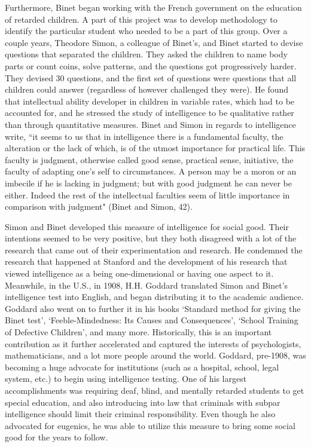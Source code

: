 \documentclass[12pt, oneside]{article}
\begin{document}
\par Furthermore, Binet began working with the French government on the education of retarded children. A part of this project was to develop methodology to identify the particular student who needed to be a part of this group. Over a couple years, Theodore Simon, a colleague of Binet's, and Binet started to devise questions that separated the children. They asked the children to name body parts or count coins, solve patterns, and the questions got progressively harder. They devised 30 questions, and the first set of questions were questions that all children could answer (regardless of however challenged they were). He found that intellectual ability developer in children in variable rates, which had to be accounted for, and he stressed the study of intelligence to be qualitative rather than through quantitative measures. Binet and Simon in regards to intelligence write, ``it seems to us that in intelligence there is a fundamental faculty, the alteration or the lack of which, is of the utmost importance for practical life. This faculty is judgment, otherwise called good sense, practical sense, initiative, the faculty of adapting one's self to circumstances. A person may be a moron or an imbecile if he is lacking in judgment; but with good judgment he can never be either. Indeed the rest of the intellectual faculties seem of little importance in comparison with judgment" (Binet and Simon, 42).

\par Simon and Binet developed this measure of intelligence for social good. Their intentions seemed to be very positive, but they both disagreed with a lot of the research that came out of their experimentation and research. He condemned the research that happened at Stanford and the development of his research that viewed intelligence as a being one-dimensional or having one aspect to it. Meanwhile, in the U.S., in 1908, H.H. Goddard translated Simon and Binet's intelligence test into English, and began distributing it to the academic audience. Goddard also went on to further it in his books `Standard method for giving the Binet test', `Feeble-Mindedness: Its Causes and Consequences', `School Training of Defective Children', and many more. Historically, this is an important contribution as it further accelerated and captured the interests of psychologists, mathematicians, and a lot more people around the world. Goddard, pre-1908, was becoming a huge advocate for institutions (such as a hospital, school, legal system, etc.) to begin using intelligence testing. One of his largest accomplishments was requiring deaf, blind, and mentally retarded students to get special education, and also introducing into law that criminals with subpar intelligence should limit their criminal responsibility. Even though he also advocated for eugenics, he was able to utilize this measure to bring some social good for the years to follow.
\end{document}
